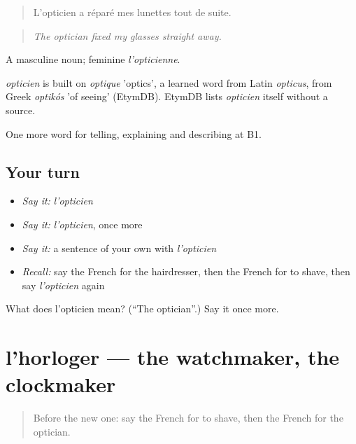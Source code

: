 \begin{quote}
L'opticien a réparé mes lunettes tout de suite.
\end{quote}

\begin{quote}
\emph{The optician fixed my glasses straight away.}
\end{quote}

A masculine noun; feminine \emph{l'opticienne}.

\begin{cousinweb}
\emph{opticien} is built on \emph{optique} 'optics', a learned word from Latin \emph{opticus}, from Greek \emph{optikós} 'of seeing' (EtymDB). EtymDB lists \emph{opticien} itself without a source.
\end{cousinweb}

\begin{grammarlens}[title={What you've built}]
One more word for telling, explaining and describing at B1.
\end{grammarlens}

\subsection*{Your turn}
\begin{itemize}
\raggedright
  \item \emph{Say it:} \emph{l'opticien}
  \item \emph{Say it:} \emph{l'opticien}, once more
  \item \emph{Say it:} a sentence of your own with \emph{l'opticien}
  \item \emph{Recall:} say the French for the hairdresser, then the French for to shave, then say \emph{l'opticien} again
\end{itemize}

\begin{tcolorbox}[breakable,colback=teal!4,colframe=teal!35!black,title={Before you move on}]
What does l'opticien mean? (\textquotedblleft{}The optician\textquotedblright{}.) Say it once more.
\end{tcolorbox}
\section[l'horloger]{l'horloger — the watchmaker, the clockmaker}

\label{lesson:FR-C448-horloger}



\begin{quote}
Before the new one: say the French for to shave, then the French for the optician.
\end{quote}

